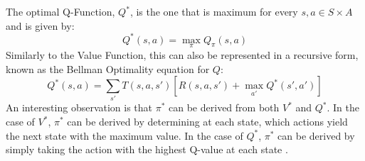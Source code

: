 The optimal Q-Function, $Q^*$, is the one that is maximum for every $s,a \in S \times A$ and is given by:
\begin{equation}
\label{eqn:qso}
Q^*(s,a) = \max_\pi Q_\pi(s,a)
\end{equation}
Similarly to the Value Function, this can also be represented in a recursive form, known as the Bellman Optimality equation for $Q$:
\begin{equation}
\label{eqn:qsB}
Q^*(s,a) = \sum_{s'}T(s,a,s')[R(s,a,s')+\max_{a'}Q^*(s',a')]
\end{equation}
An interesting observation is that $\pi^*$ can be derived from both $V^*$ and $Q^*$. In the case of $V^*$, $\pi^*$ can be derived by determining at each state, which actions yield the next state with the maximum value. In the case of $Q^*$, $\pi^*$ can be derived by simply taking the action with the highest Q-value at each state \cite{Sutton1998}.


